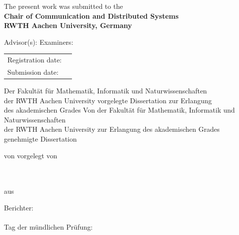 \begin{titlepage}
{The present work was submitted to the\\[5pt]
\textbf{Chair of Communication and Distributed Systems\\[5pt]
        RWTH Aachen University, Germany}
\vskip 2cm

Advisor(s):
\vskip 2mm
\advisers{}
\vskip 5mm
Examiners:
\vskip 2mm
\examiners{}
\vskip 1cm

\begin{tabular}{R{6cm}p{6cm}}
Registration date:  &  \\
Submission date:    &  \\
\end{tabular}

} %
\fi

\ifphd
\ifphdsubmitted
Der Fakult\"at f\"ur Mathematik, Informatik und Naturwissenschaften\\der RWTH Aachen University vorgelegte Dissertation zur Erlangung\\des akademischen Grades \aimeddegreeGermanPossesive{}
\fi
\ifphdapproved
Von der Fakult\"at f\"ur Mathematik, Informatik und Naturwissenschaften\\der RWTH Aachen University zur Erlangung des akademischen Grades\\\aimeddegreeGermanPossesive{} genehmigte Dissertation
\fi

\vspace{2cm}
\ifphdsubmitted
von
\fi
\ifphdapproved
vorgelegt von
\fi

\vspace{2cm}
\currentdegree{}\\
\vspace{1em}
{\large{\textbf{\firstname{} \lastname{}}}}\\
\vspace{1em}
aus \placeofbirth{}

\ifphdsubmitted
\vspace{7cm}
\fi

\ifphdapproved
\vspace{2cm}
Berichter:\\
\vspace{1em}
\examiners{}\\
\vspace{2cm}
Tag der m\"undlichen Pr\"ufung: {}
\fi
\fi

\vfill %

\end{titlepage}

